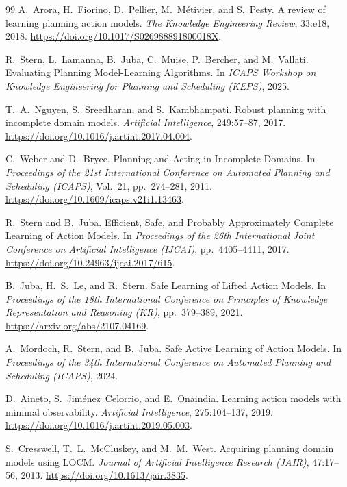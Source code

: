 \documentclass[11pt,a4paper]{article}
\theoremstyle{definition}
\begin{document}
\begin{thebibliography}{99}
A.~Arora, H.~Fiorino, D.~Pellier, M.~M{\'e}tivier, and S.~Pesty.
\newblock A review of learning planning action models.
\newblock \emph{The Knowledge Engineering Review}, 33:e18, 2018. \url{https://doi.org/10.1017/S026988891800018X}.

R.~Stern, L.~Lamanna, B.~Juba, C.~Muise, P.~Bercher, and M.~Vallati.
\newblock Evaluating Planning Model-Learning Algorithms.
\newblock In \emph{ICAPS Workshop on Knowledge Engineering for Planning and Scheduling (KEPS)}, 2025.

T.~A.~Nguyen, S.~Sreedharan, and S.~Kambhampati.
\newblock Robust planning with incomplete domain models.
\newblock \emph{Artificial Intelligence}, 249:57--87, 2017. \url{https://doi.org/10.1016/j.artint.2017.04.004}.

C.~Weber and D.~Bryce.
\newblock Planning and Acting in Incomplete Domains.
\newblock In \emph{Proceedings of the 21st International Conference on Automated Planning and Scheduling (ICAPS)}, Vol.~21, pp.~274--281, 2011. \url{https://doi.org/10.1609/icaps.v21i1.13463}.

R.~Stern and B.~Juba.
\newblock Efficient, Safe, and Probably Approximately Complete Learning of Action Models.
\newblock In \emph{Proceedings of the 26th International Joint Conference on Artificial Intelligence (IJCAI)}, pp.~4405--4411, 2017. \url{https://doi.org/10.24963/ijcai.2017/615}.

B.~Juba, H.~S.~Le, and R.~Stern.
\newblock Safe Learning of Lifted Action Models.
\newblock In \emph{Proceedings of the 18th International Conference on Principles of Knowledge Representation and Reasoning (KR)}, pp.~379--389, 2021. \url{https://arxiv.org/abs/2107.04169}.

A.~Mordoch, R.~Stern, and B.~Juba.
\newblock Safe Active Learning of Action Models.
\newblock In \emph{Proceedings of the 34th International Conference on Automated Planning and Scheduling (ICAPS)}, 2024.

D.~Aineto, S.~Jim{\'e}nez~Celorrio, and E.~Onaindia.
\newblock Learning action models with minimal observability.
\newblock \emph{Artificial Intelligence}, 275:104--137, 2019. \url{https://doi.org/10.1016/j.artint.2019.05.003}.

S.~Cresswell, T.~L.~McCluskey, and M.~M.~West.
\newblock Acquiring planning domain models using LOCM.
\newblock \emph{Journal of Artificial Intelligence Research (JAIR)}, 47:17--56, 2013. \url{https://doi.org/10.1613/jair.3835}.


\end{thebibliography}
\end{document}
